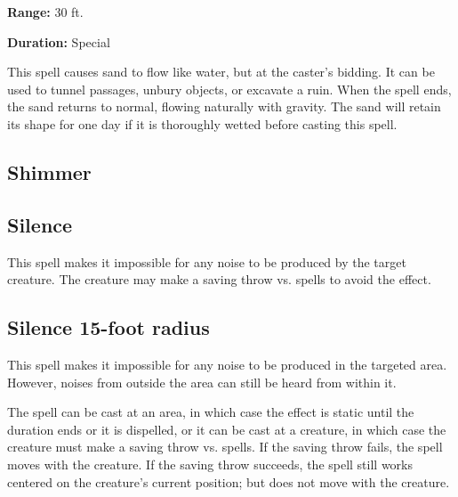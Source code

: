 \begin{multicols*}{2}
{\textbf{Range:} 30 ft.

\textbf{Duration:} Special}

This spell causes sand to flow like water, but at the caster's bidding. It can be used to tunnel passages, unbury objects, or excavate a ruin. When the spell ends, the sand returns to normal, flowing naturally with gravity. The sand will retain its shape for one day if it is thoroughly wetted before casting this spell.

\subsection{Shimmer}\label{spell:Shimmer}



\subsection{Silence}\label{spell:Silence}

This spell makes it impossible for any noise to be produced by the target creature. The creature may make a saving throw vs. spells to avoid the effect.

\subsection{Silence 15-foot radius}\label{spell:Silence 15-foot radius}

This spell makes it impossible for any noise to be produced in the targeted area. However, noises from outside the area can still be heard from within it.

The spell can be cast at an area, in which case the effect is static until the duration ends or it is dispelled, or it can be cast at a creature, in which case the creature must make a saving throw vs. spells. If the saving throw fails, the spell moves with the creature. If the saving throw succeeds, the spell still works centered on the creature’s current position; but does not move with the creature.


\end{multicols*}
